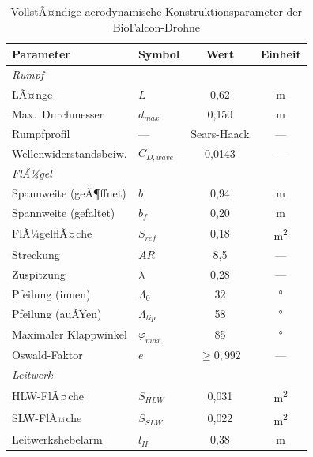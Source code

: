﻿\documentclass[12pt,a4paper]{article}
\theoremstyle{remark}
\begin{document}
	\begin{table}[H]
		\centering
		\caption{VollstÃ¤ndige aerodynamische Konstruktionsparameter der BioFalcon-Drohne}
		\label{tab:kons_param}
		\begin{tabular}{llcc}
			\toprule
			\textbf{Parameter} & \textbf{Symbol} & \textbf{Wert} & \textbf{Einheit} \\
			\midrule
			\multicolumn{4}{l}{\textit{Rumpf}} \\
			LÃ¤nge                    & $L$           & 0{,}62    & \si{\m}               \\
			Max.\ Durchmesser        & $d_{max}$     & 0{,}150   & \si{\m}               \\
			Rumpfprofil              & ---           & Sears-Haack & ---                 \\
			Wellenwiderstandsbeiw.   & $C_{D,wave}$  & 0{,}0143  & ---                   \\
			\midrule
			\multicolumn{4}{l}{\textit{FlÃ¼gel}} \\
			Spannweite (geÃ¶ffnet)    & $b$           & 0{,}94    & \si{\m}               \\
			Spannweite (gefaltet)    & $b_f$         & 0{,}20    & \si{\m}               \\
			FlÃ¼gelflÃ¤che             & $S_{ref}$     & 0{,}18    & \si{\m^2}             \\
			Streckung                & $AR$          & 8{,}5     & ---                   \\
			Zuspitzung               & $\lambda$     & 0{,}28    & ---                   \\
			Pfeilung (innen)         & $\Lambda_0$   & 32        & \si{\degree}          \\
			Pfeilung (auÃŸen)         & $\Lambda_{tip}$ & 58      & \si{\degree}          \\
			Maximaler Klappwinkel    & $\varphi_{max}$ & 85      & \si{\degree}          \\
			Oswald-Faktor            & $e$           & $\geq 0{,}992$ & ---              \\
			\midrule
			\multicolumn{4}{l}{\textit{Leitwerk}} \\
			HLW-FlÃ¤che               & $S_{HLW}$     & 0{,}031   & \si{\m^2}             \\
			SLW-FlÃ¤che               & $S_{SLW}$     & 0{,}022   & \si{\m^2}             \\
			Leitwerkshebelarm        & $l_H$         & 0{,}38    & \si{\m}               \\

\end{tabular}
\end{table}
\end{document}
